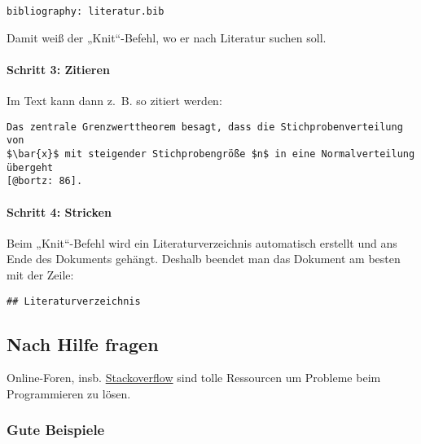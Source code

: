 \documentclass[11pt,german,a4paper]{article}
\let\oldparagraph\paragraph
\renewcommand{\paragraph}[1]{\oldparagraph{#1}\mbox{}}
\begin{document}
\begin{verbatim}
bibliography: literatur.bib
\end{verbatim}

Damit weiß der „Knit``-Befehl, wo er nach Literatur suchen soll.

\hypertarget{schritt-3-zitieren}{%
\paragraph{Schritt 3: Zitieren}\label{schritt-3-zitieren}}

Im Text kann dann z.~B. so zitiert werden:

\begin{verbatim}
Das zentrale Grenzwerttheorem besagt, dass die Stichprobenverteilung von
$\bar{x}$ mit steigender Stichprobengröße $n$ in eine Normalverteilung übergeht
[@bortz: 86].
\end{verbatim}

\hypertarget{schritt-4-stricken}{%
\paragraph{Schritt 4: Stricken}\label{schritt-4-stricken}}

Beim „Knit``-Befehl wird ein Literaturverzeichnis automatisch erstellt und ans Ende des Dokuments gehängt. Deshalb beendet man das Dokument am besten mit der Zeile:

\begin{verbatim}
## Literaturverzeichnis
\end{verbatim}

\hypertarget{nach-hilfe-fragen}{%
\subsection{Nach Hilfe fragen}\label{nach-hilfe-fragen}}

Online-Foren, insb. \href{https://stackoverflow.com}{Stackoverflow} sind tolle Ressourcen um Probleme beim Programmieren zu lösen.

\hypertarget{gute-beispiele}{%
\subsubsection{Gute Beispiele}\label{gute-beispiele}}
\end{document}
